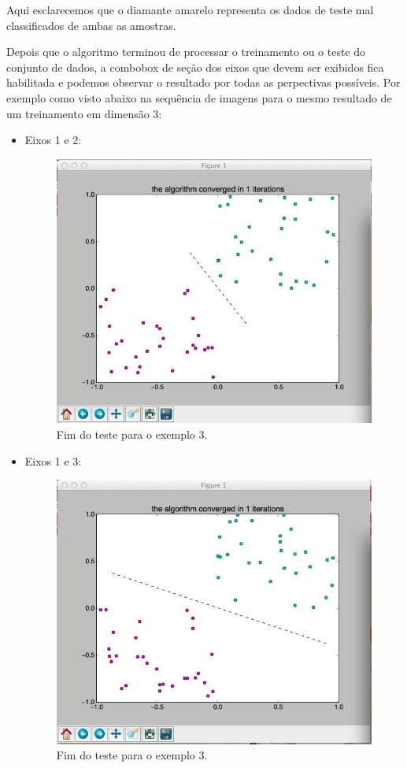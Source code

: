 \documentclass[brazil, a4paper]{article}
\begin{document}
\begin{description}
Aqui esclarecemos que o diamante amarelo representa os dados de teste mal classificados de ambas as amostras.

Depois que o algoritmo terminou de processar o treinamento ou o teste do conjunto de dados, a combobox de seção dos eixos que devem ser exibidos fica habilitada e podemos observar o resultado por todas as perpectivas possíveis. Por exemplo como visto abaixo na sequência de imagens para o mesmo resultado de um treinamento em dimensão 3:
\begin{itemize}
\item Eixos 1 e 2:
\begin{figure}[!htb]
\centering
\includegraphics[scale=0.4]{eixo12.jpg}
\caption{Fim do teste para o exemplo 3.}
\end{figure}

\item Eixos 1 e 3:
\begin{figure}[!htb]
\centering
\includegraphics[scale=0.35]{eixo13.jpg}
\caption{Fim do teste para o exemplo 3.}
\end{figure}


\end{itemize}
\end{description}
\end{document}
